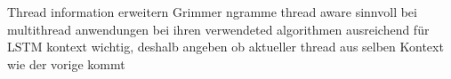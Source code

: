 %

                Thread information erweitern
                    Grimmer ngramme thread aware sinnvoll bei multithread anwendungen 
                    bei ihren verwendeted algorithmen ausreichend
                    für LSTM kontext wichtig, deshalb angeben ob aktueller thread aus selben Kontext wie der vorige kommt

